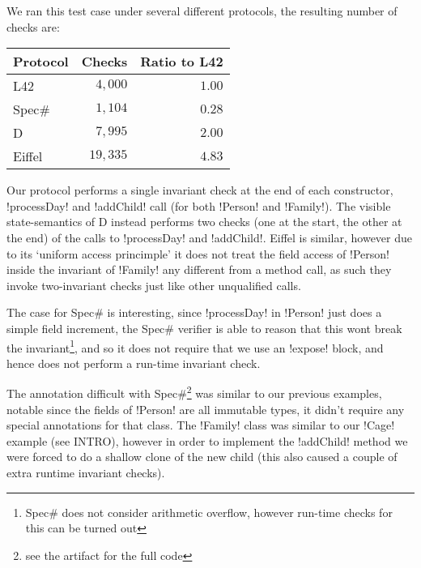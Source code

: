 We ran this test case under several different protocols, the resulting number of checks are:

\begin{tabular}{l|r|r}
	Protocol & Checks & Ratio to L42 \\
	\hline
	L42    & $4,000$ & $1.00$ \\
	Spec\# & $1,104$ & $0.28$ \\
	D      & $7,995$ & $2.00$ \\ 
	Eiffel & $19,335$ & $4.83$ \\
\end{tabular}

Our protocol performs a single invariant check at the end of each constructor,  \Q!processDay! and \Q!addChild! call (for both \Q!Person! and \Q!Family!). The visible state-semantics of D instead performs two checks (one at the start, the other at the end) of the calls to \Q!processDay! and \Q!addChild!. Eiffel is similar, however due to its `uniform access princimple' it does not treat the field access of \Q!Person! inside the invariant of \Q!Family! any different from a method call, as such they invoke two-invariant checks just like other unqualified calls.

The case for Spec\# is interesting, since \Q!processDay! in \Q!Person! just does a simple field increment, the Spec\# verifier is able to reason that this wont break the invariant\footnote{Spec\# does not consider arithmetic overflow, however run-time checks for this can be turned out}, and so it does not require that we use an \Q!expose! block, and hence does not perform a run-time invariant check.

The annotation difficult with Spec\#\footnote{see the artifact for the full code} was similar to our previous examples, notable since the fields of \Q!Person! are all immutable types, it didn't require any special annotations for that class. The \Q!Family! class was similar to our \Q!Cage! example (see INTRO), however in order to implement the \Q!addChild! method we were forced to do a shallow clone of the new child (this also caused a couple of extra runtime invariant checks).
